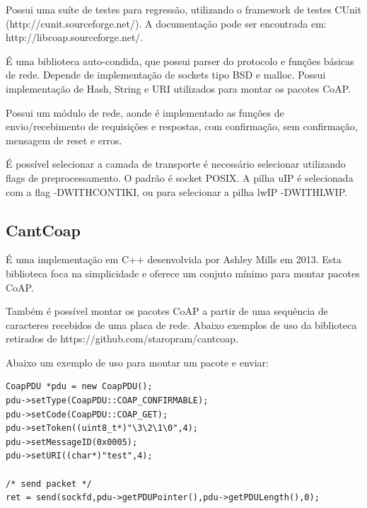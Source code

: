 Possui uma su\'ite de testes para regress\~ao, utilizando o framework de testes CUnit (http://cunit.sourceforge.net/). A documenta\c{c}\~ao pode ser encontrada em: http://libcoap.sourceforge.net/.

\'E uma biblioteca auto-condida, que possui parser do protocolo e fun\c{c}\~oes b\'asicas de rede. Depende de implementa\c{c}\~ao de sockets tipo BSD e malloc. Possui implementa\c{c}\~ao de Hash, String e URI utilizados para montar os pacotes CoAP.

Possui um m\'odulo de rede, aonde \'e implementado as fun\c{c}\~oes de envio/recebimento de requisi\c{c}\~oes e respostas, com confirma\c{c}\~ao, sem confirma\c{c}\~ao, mensagem de reset e erros.

\'E poss\'ivel selecionar a camada de transporte \'e necess\'ario selecionar utilizando flags de preprocessamento. O padr\~ao \'e socket POSIX. A pilha uIP \'e selecionada com a flag -DWITH\textunderscore CONTIKI, ou para selecionar a pilha lwIP -DWITH\textunderscore LWIP.

\subsection{CantCoap}
\'E uma implementa\c{c}\~ao em C++ desenvolvida por Ashley Mills em 2013. Esta biblioteca foca na simplicidade e oferece um conjuto m\'inimo para montar pacotes CoAP.

Tamb\'em \'e poss\'ivel montar os pacotes CoAP a partir de uma sequ\^encia de caracteres recebidos de uma placa de rede. Abaixo exemplos de uso da biblioteca retirados de https://github.com/staropram/cantcoap.


\lstset{escapechar=@,style=customc}

Abaixo um exemplo de uso para montar um pacote e enviar:

\begin{lstlisting}
CoapPDU *pdu = new CoapPDU();
pdu->setType(CoapPDU::COAP_CONFIRMABLE);
pdu->setCode(CoapPDU::COAP_GET);
pdu->setToken((uint8_t*)"\3\2\1\0",4);
pdu->setMessageID(0x0005);
pdu->setURI((char*)"test",4);

/* send packet */
ret = send(sockfd,pdu->getPDUPointer(),pdu->getPDULength(),0);
\end{lstlisting}

